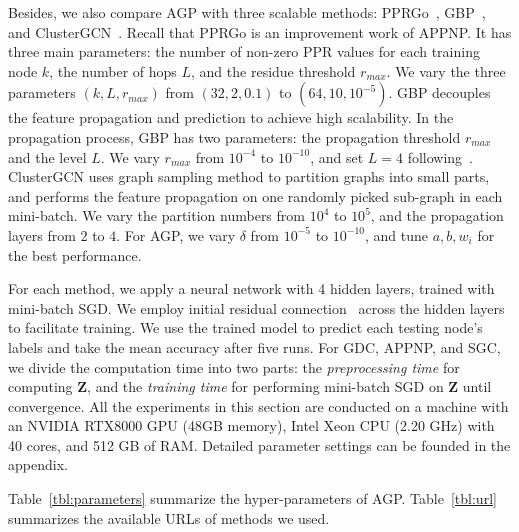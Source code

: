 Besides, we also compare AGP with three scalable methods: PPRGo~\cite{bojchevski2020scaling}, GBP~\cite{chen2020GBP}, and ClusterGCN~\cite{chiang2019clusterGCN}. Recall that PPRGo is an improvement work of APPNP. It has three main parameters: the number of non-zero PPR values for each training node $k$, the number of hops $L$, and the residue threshold $r_{max}$. We vary the three parameters $(k,L,r_{max})$ from $(32,2,0.1)$ to $(64,10,10^{-5})$. GBP decouples the feature propagation and prediction to achieve high scalability. In the propagation process, GBP has two parameters: the propagation threshold $r_{max}$ and the level $L$. We vary $r_{max}$ from $10^{-4}$ to $10^{-10}$, and set $L=4$ following~\cite{chen2020GBP}. ClusterGCN uses graph sampling method to partition graphs into small parts, and performs the feature propagation on one randomly picked sub-graph in each mini-batch. We vary the partition numbers from $10^4$ to $10^5$, and the propagation layers from $2$ to $4$. For AGP, we vary $\delta$ from $10^{-5}$ to $10^{-10}$, and tune $a,b,w_i$ for the best performance. 

For each method, we apply a neural network with 4 hidden layers, trained with mini-batch SGD. %
We employ initial residual connection~\cite{He2016ResNet} across the hidden layers to facilitate training. We use the trained model to predict each testing node's labels and take the mean accuracy after five runs. For GDC, APPNP, and SGC, we divide the computation time into two parts: the {\em preprocessing time} for computing $\mathbf{Z}$, and the {\em training time} for performing mini-batch SGD on $\mathbf{Z}$ until convergence. All the experiments in this section are conducted on a machine with an NVIDIA RTX8000 GPU (48GB memory), Intel Xeon CPU (2.20 GHz) with 40 cores, and 512 GB of RAM. Detailed parameter settings can be founded in the appendix. 


Table~\ref{tbl:parameters} summarize the hyper-parameters of AGP. 
Table~\ref{tbl:url} summarizes the available URLs of methods we used. %

